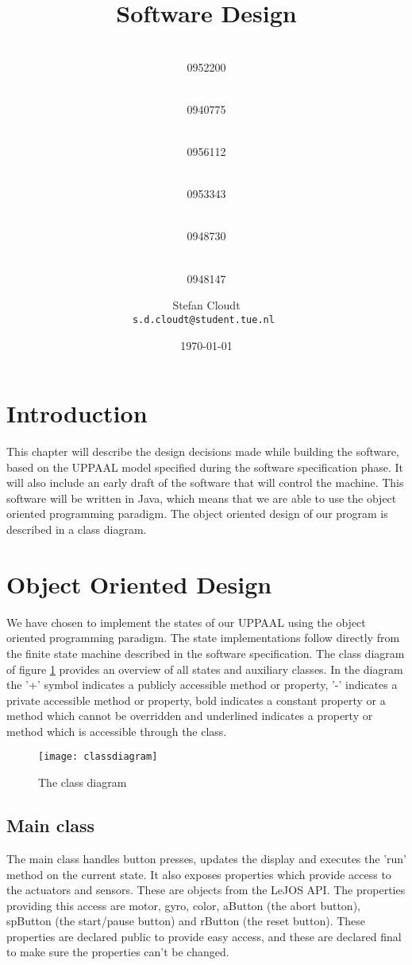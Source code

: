 \documentclass[a4paper,oneside,11pt]{article}
\title{\vspace{-\baselineskip}\sffamily\bfseries Software Design}
\author{
	\makebox[.25\linewidth]{Sergio van Amerongen}\\0952200 \and
	\makebox[.25\linewidth]{Stefan Cloudt}\\0940775 \and
	\makebox[.25\linewidth]{Daan de Graaf}\\0956112 \and
	\makebox[.25\linewidth]{Robert van Lente}\\0953343 \and
	\makebox[.25\linewidth]{Tom Peters}\\0948730 \and
	\makebox[.25\linewidth]{Berrie Trippe}\\0948147 
	\and \makebox[.75\linewidth]{\textbf{Responsible:}} \and
	Stefan Cloudt\\ \tt{s.d.cloudt@student.tue.nl}
}
\date{\today}
\begin{document}
\maketitle
\section{Introduction}
This chapter will describe the design decisions made while building the software, based on the UPPAAL model specified during the software specification phase. It will also include an early draft of the software that will control the machine. This software will be written in Java, which means that we are able to use the object oriented programming paradigm. The object oriented design of our program is described in a class diagram.

\section{Object Oriented Design}
We have chosen to implement the states of our UPPAAL using the object oriented programming paradigm. The state implementations follow directly from the finite state machine described in the software specification. The class diagram of figure \ref{classdiagram} provides an overview of all states and auxiliary classes. In the diagram the '+' symbol indicates a publicly accessible method or property, '-' indicates a private accessible method or property, bold indicates a constant property or a method which cannot be overridden and underlined indicates a property or method which is accessible through the class.

\begin{figure}[ht!]
\centering
\texttt{[image: classdiagram]}
\caption{The class diagram}
\label{classdiagram}
\end{figure}

\newpage
\subsection{Main class}
The main class handles button presses, updates the display and executes the 'run' method on the current state. It also exposes properties which provide access to the actuators and sensors. These are objects from the LeJOS API. The properties providing this access are motor, gyro, color, aButton (the abort button), spButton (the start/pause button) and rButton (the reset button). These properties are declared public to provide easy access, and these are declared final to make sure the properties can’t be changed.
\end{document}

